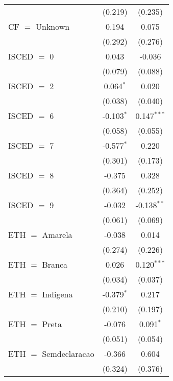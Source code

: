 \begin{table}[htbp!]
\begin{adjustbox}{width = 1\textwidth, max height = 0.95\textheight, center}
\begin{threeparttable}[b]
\begin{tabular}{lcc}
                                  & (0.219)        & (0.235)\\   
            CF $=$ Unknown        & 0.194          & 0.075\\   
                                  & (0.292)        & (0.276)\\   
            ISCED $=$ 0           & 0.043          & -0.036\\   
                                  & (0.079)        & (0.088)\\   
            ISCED $=$ 2           & 0.064$^{*}$    & 0.020\\   
                                  & (0.038)        & (0.040)\\   
            ISCED $=$ 6           & -0.103$^{*}$   & 0.147$^{***}$\\   
                                  & (0.058)        & (0.055)\\   
            ISCED $=$ 7           & -0.577$^{*}$   & 0.220\\   
                                  & (0.301)        & (0.173)\\   
            ISCED $=$ 8           & -0.375         & 0.328\\   
                                  & (0.364)        & (0.252)\\   
            ISCED $=$ 9           & -0.032         & -0.138$^{**}$\\   
                                  & (0.061)        & (0.069)\\   
            ETH $=$ Amarela       & -0.038         & 0.014\\   
                                  & (0.274)        & (0.226)\\   
            ETH $=$ Branca        & 0.026          & 0.120$^{***}$\\   
                                  & (0.034)        & (0.037)\\   
            ETH $=$ Indigena      & -0.379$^{*}$   & 0.217\\   
                                  & (0.210)        & (0.197)\\   
            ETH $=$ Preta         & -0.076         & 0.091$^{*}$\\   
                                  & (0.051)        & (0.054)\\   
            ETH $=$ Semdeclaracao & -0.366         & 0.604\\   
                                  & (0.324)        & (0.376)\\   

\end{tabular}
\end{threeparttable}
\end{adjustbox}
\end{table}

